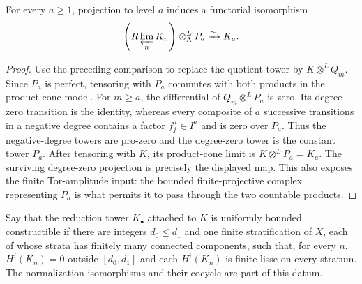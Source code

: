 \begin{lemma}
\label{lemma:weil-pbc-adic-completion-reduction}
\uses{}

For every $a\geq1$, projection to level $a$ induces a functorial
isomorphism
\[
 \left(R\varprojlim_nK_n\right)\otimes^L_\Lambda P_a
 \xrightarrow{\sim}K_a.
\]
\end{lemma}
\begin{proof}

Use the preceding comparison to replace the quotient tower by
$K\otimes^LQ_m$.  Since $P_a$ is perfect, tensoring with $P_a$ commutes
with both products in the product-cone model.  For $m\geq a$, the
differential of $Q_m\otimes^L P_a$ is zero.  Its degree-zero transition is
the identity, whereas every composite of $a$ successive transitions in a
negative degree contains a factor $f_j^a\in I^a$ and is zero over $P_a$.
Thus the negative-degree towers are pro-zero and the degree-zero tower is
the constant tower $P_a$.  After tensoring with $K$, its product-cone limit
is $K\otimes^LP_a=K_a$.  The surviving degree-zero projection is precisely
the displayed map.  This also exposes the finite Tor-amplitude input: the
bounded finite-projective complex representing $P_a$ is what permits it to
pass through the two countable products.
\end{proof}

\begin{definition}
\label{def:weil-pbc-bounded-constructible-adic-tower}
Say that the reduction tower $K_\bullet$ attached to $K$ is uniformly
bounded constructible if there are integers $d_0\leq d_1$ and one finite
stratification of $X$, each of whose strata has finitely many connected
components, such that, for every $n$, $H^i(K_n)=0$ outside
$[d_0,d_1]$ and each $H^i(K_n)$ is finite lisse on every stratum.  The
normalization isomorphisms and their cocycle are part of this datum.
\end{definition}

